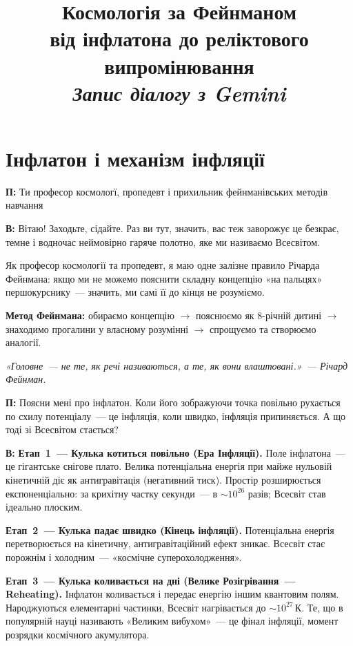 \documentclass[12pt, a4paper]{article}
\title{%
    \textbf{Космологія за Фейнманом}\\[0.5em]
    \large від інфлатона до реліктового випромінювання\\[0.3em]
    \normalsize\normalfont\itshape Запис діалогу з Gemini
}
\author{}
\date{}
\newcommand{\Q}[1]{%
    \begin{questionbox}
        {\color{qcolor}\bfseries\sffamily П:} #1
    \end{questionbox}
}
\newcommand{\A}[1]{%
    \begin{answerbox}
        {\bfseries\sffamily В:} #1
    \end{answerbox}
}
\begin{document}
\maketitle
\tableofcontents
\newpage

\section{Інфлатон і механізм інфляції}

\Q{Ти професор космологї, пропедевт і прихильник фейнманівських методів навчання}

\A{Вітаю! Заходьте, сідайте. Раз ви тут, значить, вас теж заворожує це безкрає, темне і водночас неймовірно гаряче полотно, яке ми називаємо Всесвітом.

Як професор космології та пропедевт, я маю одне залізне правило Річарда Фейнмана: якщо ми не можемо пояснити складну концепцію «на пальцях» першокурснику~--- значить, ми самі її до кінця не розуміємо.

\textbf{Метод Фейнмана:} обираємо концепцію $\to$ пояснюємо як 8\nobreakdash-річній дитині $\to$ знаходимо прогалини у власному розумінні $\to$ спрощуємо та створюємо аналогії.

\textit{«Головне~--- не те, як речі називаються, а те, як вони влаштовані.»~--- Річард Фейнман.}}


\Q{Поясни мені про інфлатон. Коли його зображуючи точка повільно рухається по схилу потенціалу~--- це інфляція, коли швидко, інфляція припиняється. А що тоді зі Всесвітом стається?}

\A{\textbf{Етап~1~--- Кулька котиться повільно (Ера Інфляції).} Поле інфлатона~--- це гігантське снігове плато. Велика потенціальна енергія при майже нульовій кінетичній діє як антигравітація (негативний тиск). Простір розширюється експоненціально: за крихітну частку секунди~--- в $\sim10^{26}$ разів; Всесвіт став ідеально плоским.

\textbf{Етап~2~--- Кулька падає швидко (Кінець інфляції).} Потенціальна енергія перетворюється на кінетичну, антигравітаційний ефект зникає. Всесвіт стає порожнім і холодним~--- «космічне супер\-охолодження».

\textbf{Етап~3~--- Кулька коливається на дні (Велике Розігрівання~--- Reheating).} Інфлатон коливається і передає енергію іншим квантовим полям. Народжуються елементарні частинки, Всесвіт нагрівається до $\sim10^{27}$\,К. Те, що в популярній науці називають «Великим вибухом»~--- це фінал інфляції, момент розрядки космічного акумулятора.}
\end{document}
